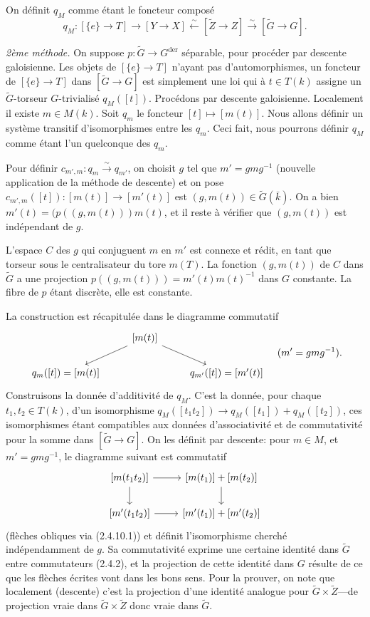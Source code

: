 \documentclass[12pt,a4paper]{article}
\theoremstyle{plain}
\theoremstyle{definition}
\theoremstyle{remark}
\newcommand{\simto}{\xrightarrow{\sim}}
\begin{document}
On d\'efinit $q_M$ comme \'etant le foncteur compos\'e
\[
q_M: [\{e\} \to T] \to [Y \to X] \xleftarrow{\sim} [\tilde{Z} \to Z] \simto [\tilde{G} \to G].
\]

\textit{2\`eme m\'ethode.} On suppose $p:\tilde{G} \to G^{\text{der}}$ s\'eparable, pour proc\'eder par descente galoisienne. Les objets de $[\{e\} \to T]$ n'ayant pas d'automorphismes, un foncteur de $[\{e\} \to T]$ dans $[\tilde{G} \to G]$ est simplement une loi qui \`a $t \in T(k)$ assigne un $\tilde{G}$-torseur $G$-trivialis\'e $q_M([t])$. Proc\'edons par descente galoisienne. Localement il existe $m \in M(k)$. Soit $q_m$ le foncteur $[t] \mapsto [m(t)]$. Nous allons d\'efinir un syst\`eme transitif d'isomorphismes entre les $q_m$. Ceci fait, nous pourrons d\'efinir $q_M$ comme \'etant l'un quelconque des $q_m$.

Pour d\'efinir $c_{m',m}: q_m \xrightarrow{\sim} q_{m'}$, on choisit $g$ tel que $m' = gmg^{-1}$ (nouvelle application de la m\'ethode de descente) et on pose $c_{m',m}([t]): [m(t)] \to [m'(t)]$ est $(g, m(t)) \in \tilde{G}(\bar{k})$. On a bien $m'(t) = (p((g,m(t)))m(t)$, et il reste \`a v\'erifier que $(g,m(t))$ est ind\'ependant de $g$.

L'espace $C$ des $g$ qui conjuguent $m$ en $m'$ est connexe et r\'edit, en tant que torseur sous le centralisateur du tore $m(T)$. La fonction $(g, m(t))$ de $C$ dans $\tilde{G}$ a une projection $p((g,m(t))) = m'(t)m(t)^{-1}$ dans $G$ constante. La fibre de $p$ \'etant discr\`ete, elle est constante.

La construction est r\'ecapitul\'ee dans le diagramme commutatif
\begin{equation}\label{eq:2.4.10.1}
\begin{tikzcd}
& {[m(t)]} \arrow[dr] \arrow[dl] \\
q_m([t]) = [m(t)] & & q_{m'}([t]) = [m'(t)]
\end{tikzcd}
\quad (m' = gmg^{-1}).
\end{equation}
Construisons la donn\'ee d'additivit\'e de $q_M$. C'est la donn\'ee, pour chaque $t_1, t_2 \in T(k)$, d'un isomorphisme $q_M([t_1t_2]) \to q_M([t_1]) + q_M([t_2])$, ces isomorphismes \'etant compatibles aux donn\'ees d'associativit\'e et de commutativit\'e pour la somme dans $[\tilde{G} \to G]$. On les d\'efinit par descente: pour $m \in M$, et $m' = gmg^{-1}$, le diagramme suivant est commutatif
\[
\begin{tikzcd}
{[m(t_1t_2)]} \arrow[r] \arrow[d] & {[m(t_1)] + [m(t_2)]} \arrow[d] \\
{[m'(t_1t_2)]} \arrow[r] & {[m'(t_1)] + [m'(t_2)]}
\end{tikzcd}
\]
(fl\`eches obliques via (2.4.10.1)) et d\'efinit l'isomorphisme cherch\'e ind\'ependamment de $g$. Sa commutativit\'e exprime une certaine identit\'e dans $\tilde{G}$ entre commutateurs (2.4.2), et la projection de cette identit\'e dans $G$ r\'esulte de ce que les fl\`eches \'ecrites vont dans les bons sens. Pour la prouver, on note que localement (descente) c'est la projection d'une identit\'e analogue pour $\tilde{G} \times \tilde{Z}$---de projection vraie dans $\tilde{G} \times \tilde{Z}$ donc vraie dans $\tilde{G}$.
\end{document}
